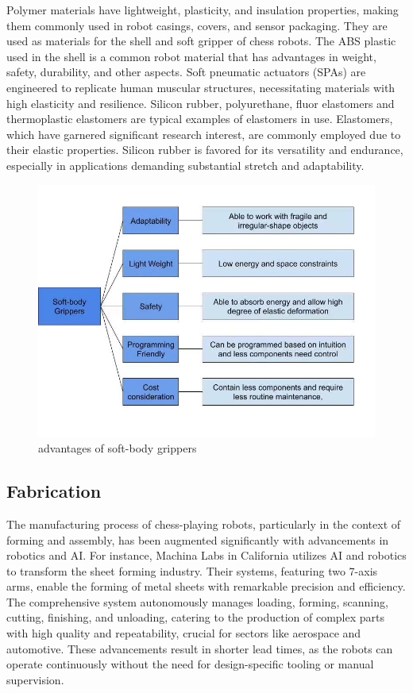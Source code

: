 \documentclass[10pt, a4paper, twocolumn]{article}
\begin{document}
Polymer materials have lightweight, plasticity, and insulation properties, making them commonly used in robot casings, covers, and sensor packaging. They are used as materials for the shell and soft gripper of chess robots. The ABS plastic used in the shell is a common robot material that has advantages in weight, safety, durability, and other aspects. Soft pneumatic actuators (SPAs) are engineered to replicate human muscular structures, necessitating materials with high elasticity and resilience\cite{Rus2015}. Silicon rubber, polyurethane, fluor elastomers and thermoplastic elastomers are typical examples of elastomers in use.  Elastomers, which have garnered significant research interest\cite{Moseley2016}, are commonly employed due to their elastic properties. Silicon rubber is favored for its versatility and endurance, especially in applications demanding substantial stretch and adaptability\cite{Xavier2022}.

\begin{figure}
    \centering
    \includegraphics[width=1\linewidth]{advantages of soft-body grippers.jpg}
    \caption{advantages of soft-body grippers}
    \label{fig:advantages of soft-body grippers}
\end{figure}

\subsection{Fabrication}
The manufacturing process of chess-playing robots, particularly in the context of forming and assembly, has been augmented significantly with advancements in robotics and AI. For instance, Machina Labs in California utilizes AI and robotics to transform the sheet forming industry. Their systems, featuring two 7-axis arms, enable the forming of metal sheets with remarkable precision and efficiency\cite{Khalid2023}. The comprehensive system autonomously manages loading, forming, scanning, cutting, finishing, and unloading, catering to the production of complex parts with high quality and repeatability, crucial for sectors like aerospace and automotive. These advancements result in shorter lead times, as the robots can operate continuously without the need for design-specific tooling or manual supervision\cite{harfoush2021application}.
\end{document}
